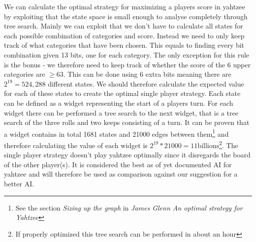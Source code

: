 We can calculate the optimal strategy for maximizing a players score in yahtzee by exploiting that the state space is small enough to analyse completely through tree search. Mainly we can exploit that we don't have to calculate all states for each possible combination of categories and score. Instead we need to only keep track of what categories that have been chosen. This equals to finding every bit combination given 13 bits, one for each category. The only exception for this rule is the bonus - we therefore need to keep track of whether the score of the 6 upper categories are $\geq 63$. This can be done using 6 extra bits meaning there are $2^{19} = 524,288$ different states. We should therefore calculate the expected value for each of these states to create the optimal single player strategy. \newline \hspace*{20px} Each state can be defined as a widget representing the start of a players turn. For each widget there can be performed a tree search to the next widget, that is a tree search of the three rolls and two keeps consisting of a turn. It can be proven that a widget contains in total 1681 states and 21000 edges between them\footnote{See the section \emph{Sizing up the graph} in \emph{James Glenn An optimal strategy for Yahtzee}\cite{glenn2006optimal}} and therefore calculating the value of each widget is $2^{19} * 21000 = 11\mbox{billions}$\footnote{If properly optimized this tree search can be performed in about an hour}. \newline \hspace*{20px} The single player strategy doesn't play yahtzee optimally since it disregards the board of the other player(s). It is considered the best as of yet documented AI for yahtzee and will therefore be used as comparison against our suggestion for a better AI. 